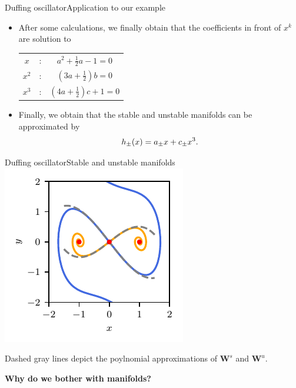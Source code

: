 \documentclass[usenames,dvipsnames,svgnames,10pt,aspectratio=169]{beamer}
\begin{document}
\begin{frame}[t, c]{Duffing oscillator}{Application to our example}
	\begin{itemize}
		\item After some calculations, we finally obtain that the coefficients in front of $x^k$ are solution to

		\medskip

		\begin{center}
			\begin{tabular}{ccc}
				$x$ & : & $a^2 + \displaystyle \frac{1}{2}a - 1 = 0$ \\
				$x^2$ & : & $\left( 3a + \displaystyle \frac{1}{2} \right) b = 0$ \\
				$x^3$ & : & $\left( 4a + \displaystyle \frac{1}{2} \right) c + 1= 0$
			\end{tabular}
		\end{center}

		\bigskip

		\item Finally, we obtain that the stable and unstable manifolds can be approximated by
		\begin{equation}
			h_{\pm}(x) = a_{\pm} x + c_{\pm} x^3.
			\notag
		\end{equation}
	\end{itemize}
\end{frame}

\begin{frame}[t, c]{Duffing oscillator}{Stable and unstable manifolds}
	\centering
	\includegraphics[width=.375\textwidth]{duffing_oscillator_saddle_manifold_ter}

	Dashed gray lines depict the poylnomial approximations of ${\bm W}^s$ and ${\bm W^u}$.

	\vspace{1cm}
\end{frame}

\begin{frame}[t, c]{}
	\centering
	\vspace{1cm}

	{\Large \textbf{Why do we bother with manifolds?}}

	\bigskip

	{}

\end{frame}
\end{document}
